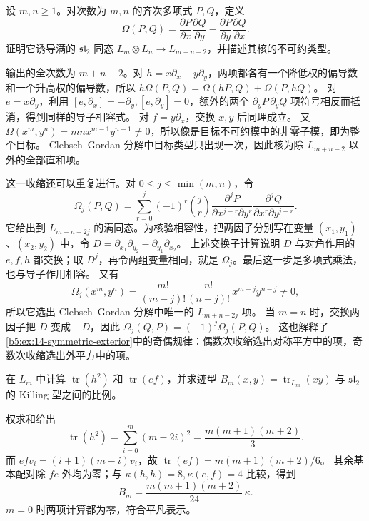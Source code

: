 \begin{exercise}\label{b5:ex:14-polynomial-contraction}
	设 \(m,n\geq1\)。对次数为 \(m,n\) 的齐次多项式 \(P,Q\)，定义
	\[
		\Omega(P,Q)=\frac{\partial P}{\partial x}\frac{\partial Q}{\partial y} -\frac{\partial P}{\partial y}\frac{\partial Q}{\partial x}.
	\]
	证明它诱导满的 \(\mathfrak{sl}_2\) 同态 \(L_m\otimes L_n\to L_{m+n-2}\)，并描述其核的不可约类型。
\end{exercise}
\begin{solution}
	输出的全次数为 \(m+n-2\)。对 \(h=x\partial_x-y\partial_y\)，两项都各有一个降低权的偏导数和一个升高权的偏导数，所以 \(h\Omega(P,Q)=\Omega(hP,Q)+\Omega(P,hQ)\)。 对 \(e=x\partial_y\)，利用 \([e,\partial_x]=-\partial_y,[e,\partial_y]=0\)，额外的两个 \(\partial_yP\,\partial_yQ\) 项符号相反而抵消，得到同样的导子相容式。 对 \(f=y\partial_x\)，交换 \(x,y\) 后同理成立。 又 \(\Omega(x^m,y^n)=mnx^{m-1}y^{n-1}\ne0\)，所以像是目标不可约模中的非零子模，即为整个目标。 Clebsch--Gordan 分解中目标类型只出现一次，因此核为除 \(L_{m+n-2}\) 以外的全部直和项。

	这一收缩还可以重复进行。对 \(0\le j\le\min(m,n)\)，令
	\[
		\Omega_j(P,Q)=\sum_{r=0}^j(-1)^r\binom jr \frac{\partial^jP}{\partial x^{j-r}\partial y^r} \frac{\partial^jQ}{\partial x^r\partial y^{j-r}}.
	\]
	它给出到 \(L_{m+n-2j}\) 的满同态。为核验相容性，把两因子分别写在变量 \((x_1,y_1)\)、\((x_2,y_2)\) 中，令 \(D=\partial_{x_1}\partial_{y_2}-\partial_{y_1}\partial_{x_2}\)。 上述交换子计算说明 \(D\) 与对角作用的 \(e,f,h\) 都交换；取 \(D^j\)，再令两组变量相同，就是 \(\Omega_j\)。最后这一步是多项式乘法，也与导子作用相容。 又有
	\[
		\Omega_j(x^m,y^n)=\frac{m!}{(m-j)!}\frac{n!}{(n-j)!}\,x^{m-j}y^{n-j}\ne0,
	\]
	所以它选出 Clebsch--Gordan 分解中唯一的 \(L_{m+n-2j}\) 项。 当 \(m=n\) 时，交换两因子把 \(D\) 变成 \(-D\)，因此 \(\Omega_j(Q,P)=(-1)^j\Omega_j(P,Q)\)。 这也解释了\cref{b5:ex:14-symmetric-exterior}中的奇偶规律：偶数次收缩选出对称平方中的项，奇数次收缩选出外平方中的项。
\end{solution}

\begin{exercise}\label{b5:ex:14-trace-form}
	在 \(L_m\) 中计算 \(\operatorname{tr}(h^2)\) 和 \(\operatorname{tr}(ef)\)，并求迹型 \(B_m(x,y)=\operatorname{tr}_{L_m}(xy)\) 与 \(\mathfrak{sl}_2\) 的 Killing 型之间的比例。
\end{exercise}
\begin{solution}
	权求和给出
	\[
		\operatorname{tr}(h^2) =\sum_{i=0}^m(m-2i)^2 =\frac{m(m+1)(m+2)}3.
	\]
	而 \(efv_i=(i+1)(m-i)v_i\)，故 \(\operatorname{tr}(ef)=m(m+1)(m+2)/6\)。 其余基本配对除 \(fe\) 外均为零；与 \(\kappa(h,h)=8,\kappa(e,f)=4\) 比较，得到
	\[
		B_m=\frac{m(m+1)(m+2)}{24}\,\kappa.
	\]
	\(m=0\) 时两项计算都为零，符合平凡表示。
\end{solution}

